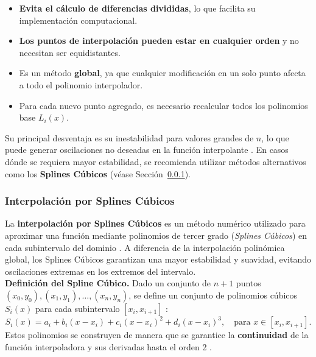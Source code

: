 \documentclass{article}
\begin{document}
\begin{itemize}
    \item \textbf{Evita el cálculo de diferencias divididas}, lo que facilita su implementación computacional.
    \item \textbf{Los puntos de interpolación pueden estar en cualquier orden} y no necesitan ser equidistantes.
    \item Es un método \textbf{global}, ya que cualquier modificación en un solo punto afecta a todo el polinomio interpolador.
    \item Para cada nuevo punto agregado, es necesario recalcular todos los polinomios base $ L_i(x) $.
\end{itemize}

Su principal desventaja es su inestabilidad para valores grandes de $n$, lo que puede generar oscilaciones no deseadas en la función interpolante \cite{lagrange1}. En casos dónde se requiera mayor estabilidad, se recomienda utilizar métodos alternativos como los \textbf{Splines Cúbicos} (véase Sección~\ref{subsec:splines-cubicos}).


\newpage
\subsubsection{Interpolación por Splines Cúbicos}
\label{subsec:splines-cubicos}

La \textbf{interpolación por Splines Cúbicos} es un método numérico utilizado para aproximar una función mediante polinomios de tercer grado (\textit{Splines Cúbicos}) en cada subintervalo del dominio \cite{splines1, splines2}.
A diferencia de la interpolación polinómica global, los Splines Cúbicos garantizan una mayor estabilidad y suavidad, evitando oscilaciones extremas en los extremos del intervalo.\\

\noindent \textbf{Definición del Spline Cúbico.}  
Dado un conjunto de $n+1$ puntos $(x_0, y_0), (x_1, y_1), \dots, (x_n, y_n)$, se define un conjunto de polinomios cúbicos $S_i(x)$ para cada subintervalo $[x_i, x_{i+1}]$ \cite{splines3}:
\begin{equation}
S_i(x) = a_i + b_i (x - x_i) + c_i (x - x_i)^2 + d_i (x - x_i)^3, \quad \text{para } x \in [x_i, x_{i+1}].
\end{equation}
Estos polinomios se construyen de manera que se garantice la \textbf{continuidad} de la función interpoladora y sus derivadas hasta el orden 2 \cite{splines4}.
\end{document}
